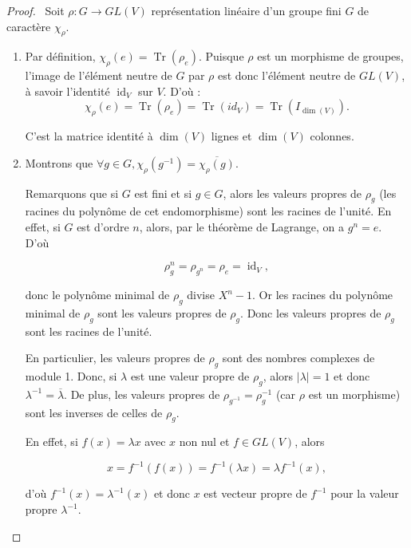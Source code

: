 \documentclass[french]{book}
\theoremstyle{definition}
\theoremstyle{remark}
\begin{document}
\begin{proof}

  \
  Soit \(\rho : G \longrightarrow GL(V)\) représentation linéaire d'un groupe fini \(G\) de caractère \(\chi _{\rho}\).
  \begin{enumerate}
    \item Par définition, \(\chi _{\rho}(e) = \operatorname{Tr}(\rho_e) \). Puisque \(\rho\) est un morphisme de groupes, l'image de l'élément neutre de \(G\) par \(\rho\) est donc l'élément neutre de \(GL(V)\), à savoir l'identité \(\operatorname{id}_V\) sur \(V\). D'où : \[\chi _{\rho}(e) = \operatorname{Tr}(\rho_e) = \operatorname{Tr}(id_V) = \operatorname{Tr}(I _{\operatorname{dim}(V)}). \]

    C'est la matrice identité à \(\operatorname{dim}(V)\) lignes et \(\operatorname{dim}(V)\) colonnes.

    \item Montrons que \(\forall g \in G, \chi _{\rho}(g ^{-1} ) = \overline{\chi _{\rho}(g)}\).

    Remarquons que si \(G\) est fini et si \(g \in G\), alors les valeurs propres de \(\rho_g\) (les racines du polynôme de cet endomorphisme) sont les racines de l'unité. En effet, si \(G\) est d'ordre \(n\), alors, par le théorème de Lagrange, on a \(g ^{n} = e\). D'où

    \[\rho_g ^{n} = \rho _{g ^{n}} = \rho_e = \operatorname{id}_V,\]

    donc le polynôme minimal de \(\rho_g\) divise \(X ^{n}-1\). Or les racines du polynôme minimal de \(\rho_g\) sont les valeurs propres de \(\rho_g\). Donc les valeurs propres de \(\rho_g\) sont les racines de l'unité.

    En particulier, les valeurs propres de \(\rho_g\) sont des nombres complexes de module 1. Donc, si \(\lambda \) est une valeur propre de \(\rho_g\), alors \(\lvert \lambda  \rvert = 1\) et donc \(\lambda  ^{-1} = \overline{\lambda }\). De plus, les valeurs propres de \(\rho _{g ^{-1}} = \rho _{g} ^{-1} \) (car \(\rho\) est un morphisme) sont les inverses de celles de \(\rho_g\).

    En effet, si \(f(x) = \lambda x\) avec \(x\) non nul et \(f \in GL(V)\), alors

    \[x =  f ^{-1} (f(x)) = f ^{-1} (\lambda x) = \lambda f ^{-1} (x),\]

    d'où \(f ^{-1} (x) = \lambda ^{-1} (x)\) et donc \(x\) est vecteur propre de \(f ^{-1} \) pour la valeur propre \(\lambda ^{-1} \).


\end{enumerate}
\end{proof}
\end{document}
